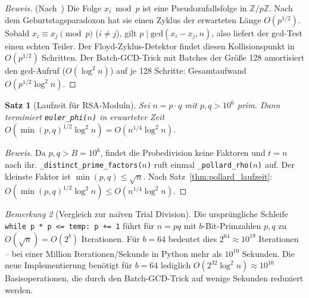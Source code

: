 ﻿\documentclass[12pt, a4paper]{article}
\theoremstyle{plain}
\newtheorem{theorem}{Satz}[section]
\theoremstyle{definition}
\theoremstyle{remark}
\newtheorem{remark}[theorem]{Bemerkung}
\newenvironment{myproof}[1][Beweis]{%
  \begin{proof}[#1]
}{%
  \end{proof}
}
\newcommand{\Z}{\mathbb{Z}}
\newcommand{\GCD}{\mathrm{gcd}}
\begin{document}
\begin{myproof}
  (Nach~\cite{pollard1975montecarlo}) Die Folge $x_i \bmod p$ ist eine
  Pseudozufallsfolge in $\Z/p\Z$. Nach dem Geburtstagsparadoxon hat
  sie einen Zyklus der erwarteten L\"ange $O(p^{1/2})$. Sobald
  $x_i \equiv x_j \pmod{p}$ ($i \ne j$), gilt
  $p \mid \GCD(x_i - x_j, n)$, also liefert der $\GCD$-Test einen
  echten Teiler. Der Floyd-Zyklus-Detektor findet diesen Kollisionspunkt
  in $O(p^{1/2})$ Schritten. Der Batch-GCD-Trick mit Batches der
  Gr\"o{\ss}e 128 amortisiert den $\GCD$-Aufruf ($O(\log^2 n)$)
  auf je 128 Schritte: Gesamtaufwand $O(p^{1/2} \log^2 n)$.
\end{myproof}

\begin{theorem}[Laufzeit f\"ur RSA-Moduln]\label{thm:phi_laufzeit_rsa}
  Sei $n = p \cdot q$ mit $p, q > 10^6$ prim. Dann terminiert
  \texttt{euler\_phi($n$)} in erwarteter Zeit
  $O\!\left(\min(p,q)^{1/2} \log^2 n\right) = O\!\left(n^{1/4} \log^2 n\right)$.
\end{theorem}

\begin{myproof}
  Da $p, q > B = 10^6$, findet die Probedivision keine Faktoren und
  $t = n$ nach ihr. \texttt{\_distinct\_prime\_factors($n$)} ruft einmal
  \texttt{\_pollard\_rho($n$)} auf. Der kleinste Faktor ist
  $\min(p,q) \le \sqrt{n}$. Nach Satz~\ref{thm:pollard_laufzeit}:
  $O(\min(p,q)^{1/2} \log^2 n) \le O(n^{1/4} \log^2 n)$.
\end{myproof}

\begin{remark}[Vergleich zur na\"iven Trial Division]\label{rem:naiv_problem}
  Die urspr\"ungliche Schleife \texttt{while p * p <= temp: p += 1}
  f\"uhrt f\"ur $n = pq$ mit $b$-Bit-Primzahlen $p, q$ zu
  $O(\sqrt{n}) = O(2^b)$ Iterationen. F\"ur $b = 64$ bedeutet dies
  $2^{64} \approx 10^{19}$ Iterationen -- bei einer Million
  Iterationen/Sekunde in Python mehr als $10^{10}$ Sekunden.
  Die neue Implementierung ben\"otigt f\"ur $b=64$ lediglich
  $O(2^{32} \log^2 n) \approx 10^{10}$ Basisoperationen, die durch
  den Batch-GCD-Trick auf wenige Sekunden reduziert werden.
\end{remark}
\end{document}
